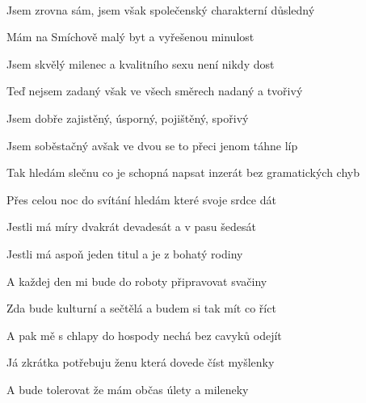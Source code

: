 

\zs
{}    ~ 

Jsem zrovna sám, jsem však společenský charakterní důsledný

Mám na Smíchově malý byt a vyřešenou minulost

Jsem skvělý milenec a kvalitního sexu není nikdy dost
\ks

 
\zs
Teď nejsem zadaný však ve všech směrech nadaný a tvořivý

Jsem dobře zajistěný, úsporný, pojištěný, spořivý

Jsem soběstačný avšak ve dvou se to přeci jenom táhne líp

Tak hledám slečnu co je schopná napsat inzerát bez gramatických chyb
\ks
 
\zr
{}   

   

   

  
\kr
 
\zs
Přes celou noc do svítání hledám které svoje srdce dát

Jestli má míry dvakrát devadesát a v pasu šedesát

Jestli má aspoň jeden titul a je z bohatý rodiny

A každej den mi bude do roboty připravovat svačiny
\ks
 
\zs
Zda bude kulturní a sečtělá a budem si tak mít co říct

A pak mě s chlapy do hospody nechá bez cavyků odejít

Já zkrátka potřebuju ženu která dovede číst myšlenky

A bude tolerovat že mám občas úlety a mileneky
\ks

\zr
\kr

\kp
